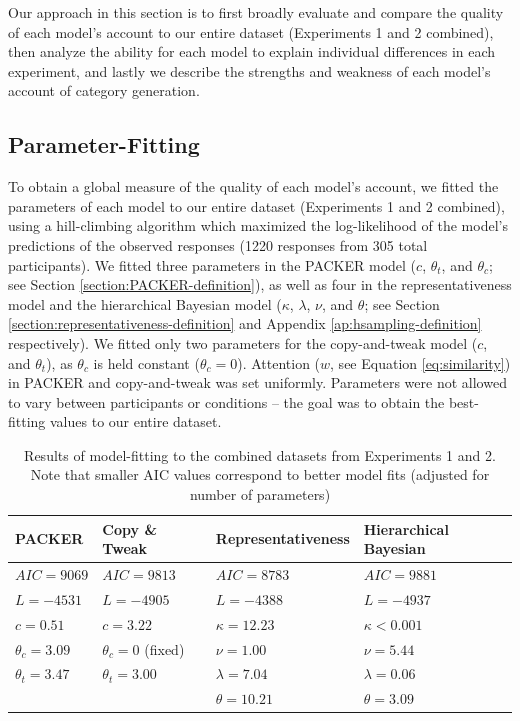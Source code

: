 \documentclass[12pt]{article}
\begin{document}
\begin{flushleft}
Our approach in this section is to first broadly evaluate and compare the
quality of each model's account to our entire dataset (Experiments 1 and 2
combined), then analyze the ability for each model to explain individual
differences in each experiment, and lastly we describe the strengths and
weakness of each model's account of category generation.

\subsection{Parameter-Fitting}

To obtain a global measure of the quality of each model's account, we fitted the
parameters of each model to our entire dataset (Experiments 1 and 2 combined),
using a hill-climbing algorithm which maximized the log-likelihood of the
model's predictions of the observed responses (1220 responses from 305 total
participants). We fitted three parameters in the PACKER model ($c$, $\theta_t$,
and $\theta_c$; see Section \ref{section:PACKER-definition}), as well as four in
the representativeness model and the hierarchical Bayesian model ($\kappa$,
$\lambda$, $\nu$, and $\theta$; see Section
\ref{section:representativeness-definition} and Appendix
\ref{ap:hsampling-definition} respectively). We fitted only two parameters for
the copy-and-tweak model ($c$, and $\theta_t$), as $\theta_c$ is held constant
($\theta_c = 0$). Attention ($w$, see Equation \ref{eq:similarity}) in PACKER
and copy-and-tweak was set uniformly. Parameters were not allowed to vary
between participants or conditions -- the goal was to obtain the best-fitting
values to our entire dataset.

\begin{table} \centering
\caption{Results of model-fitting to the combined datasets from Experiments 1
and 2. Note that smaller AIC values correspond to better model fits (adjusted
for number of parameters)}
\label{table:global-model-fits}
\begin{tabular}{ l l l l} \\ \textbf{PACKER} & \textbf{Copy \& Tweak} &
\textbf{Representativeness} & \textbf{Hierarchical Bayesian} \\ \hline $AIC =
  9069$ & $AIC = 9813$ & $AIC = 8783$ &  $AIC =
9881$ \\ $L = -4531$ & $L = -4905$ & $L = -4388$ & $L = -4937$ \\ $c = 0.51$ &
                                                                                $c = 3.22$ & $\kappa = 12.23$ &
$\kappa < 0.001$ \\ $\theta_c = 3.09$ & $\theta_c = 0$ (fixed) & $\nu = 1.00$ & $\nu = 5.44$ \\
$\theta_t = 3.47$ & $\theta_t = 3.00$ & $\lambda = 7.04$& $\lambda
                                                                       = 0.06$
  \\ & &$\theta = 10.21 $& $\theta = 3.09$
\\
\end{tabular}
\end{table}



\end{flushleft}
\end{document}
